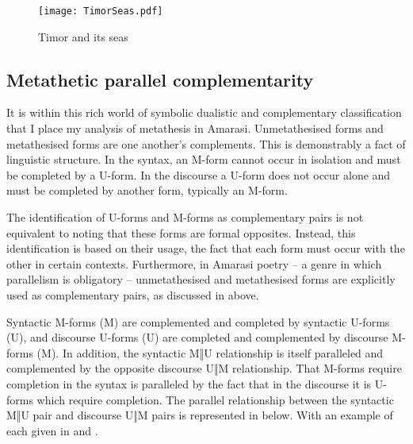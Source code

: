 \begin{figure}[h]
	\caption{Timor and its seas}\label{fig:TimSea}
	\texttt{[image: TimorSeas.pdf]}
\end{figure}

\subsection{Metathetic parallel complementarity}\label{sec:MetParCom}
It is within this rich world of symbolic dualistic and complementary
classification that I place my analysis of metathesis in Amarasi.
Unmetathesised forms and metathesised forms are one another's complements.
This is demonstrably a fact of linguistic structure.
In the syntax, an M-form cannot occur in isolation and must be completed by a U-form.
In the discourse a U-form does not occur alone
and must be completed by another form, typically an M-form.

The identification of U-forms and M-forms as complementary pairs
is not equivalent to noting that these forms are formal opposites.
Instead, this identification is based on their usage,
the fact that each form must occur with the other in certain contexts.
Furthermore, in Amarasi poetry
-- a genre in which parallelism is obligatory --
unmetathesised and metathesised forms
are explicitly used as complementary pairs,
as discussed in  above. %

Syntactic M-forms (M) are complemented and completed by syntactic U-forms (U),
and discourse U-forms (U) are completed and complemented by discourse M-forms (M).
In addition, the syntactic M‖U relationship
is itself paralleled and complemented by the opposite discourse U‖M relationship.
That M-forms require completion in the syntax is paralleled by the fact
that in the discourse it is U-forms which require completion.
The parallel relationship between the syntactic M‖U pair
and discourse U‖M pairs is represented in  below.
With an example of each given in  and .

